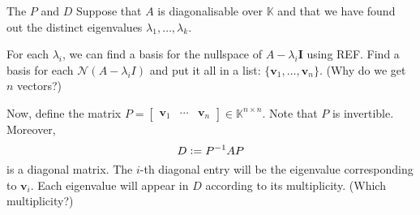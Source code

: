 \documentclass[dvipsnames]{beamer}
\theoremstyle{definition}
\begin{document}
\begin{frame}{The \texorpdfstring{$P$}{P} and \texorpdfstring{$D$}{D}}
    Suppose that $A$ is diagonalisable over $\mathbb{K}$ and that we have found out the distinct eigenvalues $\lambda_{1}, \ldots, \lambda_{k}$. \pause

    For each $\lambda_{i}$, we can find a basis for the nullspace of $A - \lambda_{i} \mathbf{I}$ using REF. \pause Find a basis for each $\mathcal{N}(A - \lambda_{i} I)$ and put it all in a list: $\{\mathbf{v}_{1}, \ldots, \mathbf{v}_{n}\}$. \pause (Why do we get $n$ vectors?) \pause

    Now, define the matrix $P = \begin{bmatrix}
        \mathbf{v}_{1} & \cdots & \mathbf{v}_{n}
    \end{bmatrix} \in \mathbb{K}^{n \times n}$. \pause Note that $P$ is invertible. \pause Moreover,
    \begin{equation*} 
        D \vcentcolon= P^{-1} A P
    \end{equation*}
    is a diagonal matrix. \pause The $i$-th diagonal entry will be the eigenvalue corresponding to $\mathbf{v}_{i}$. \pause Each eigenvalue will appear in $D$ according to its multiplicity. \pause (Which multiplicity?)
\end{frame}
\end{document}
